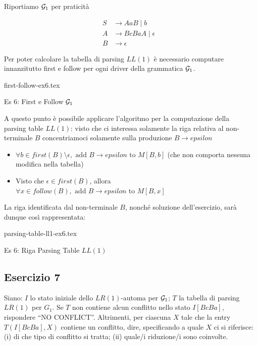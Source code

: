 \documentclass[class=book, crop=false, oneside, 12pt]{standalone}
\begin{document}
Riportiamo \(\mathcal{G}_1\) per praticità

\begin{align*}
    S &\to AaB \mid b \\
    A &\to BcBaA \mid \epsilon \\
    B &\to \epsilon
\end{align*}

Per poter calcolare la tabella di parsing \(LL(1)\) è necessario computare innanzitutto first e follow per ogni driver della grammatica \(\mathcal{G}_1\).

\begin{table}[H]
    \centering
    {first-follow-ex6.tex}
    \caption{Es 6: First e Follow \(\mathcal{G}_1\)}
    \label{tab:first-follow-ex6}
\end{table}

A questo punto è possibile applicare l'algoritmo per la computazione della parsing table \(LL(1)\): visto che ci interessa solamente la riga relativa al non-terminale \(B\) concentriamoci solamente sulla produzione \(B \to epsilon\)

\begin{itemize}
    \item \(\forall b \in first(B) \setminus \epsilon, \textrm{ add } B \to epsilon \textrm{ to } M[B, b]\) (che non comporta nessuna modifica nella tabella)
    \item Visto che \(\epsilon \in first(B)\), allora \(\forall x \in follow(B), \textrm{ add } B \to epsilon \textrm{ to } M[B, x]\)
\end{itemize}

La riga identificata dal non-terminale \(B\), nonché soluzione dell'esercizio, sarà dunque così rappresentata:

\begin{table}[H]
    \centering
    {parsing-table-ll1-ex6.tex}
    \caption{Es 6: Riga Parsing Table \(LL(1)\)}
    \label{tab:parsing-table-ll1-ex6}
\end{table}

\subsection{Esercizio 7}

Siano: \(I\) lo stato iniziale dello \(LR(1)\)-automa per \(\mathcal{G}_1\); \(T\) la tabella di parsing \(LR(1)\) per \(G_1\).  Se \(T\) non contiene alcun conflitto nello stato \(I[BcBa]\), rispondere “NO CONFLICT”.  Altrimenti, per ciascuna \(X\) tale che la entry \(T(I[BcBa],X)\) contiene un conflitto, dire, specificando a quale \(X\) ci si riferisce:  (i) di che tipo di conflitto si tratta; (ii) quale/i riduzione/i sono coinvolte.
\end{document}
